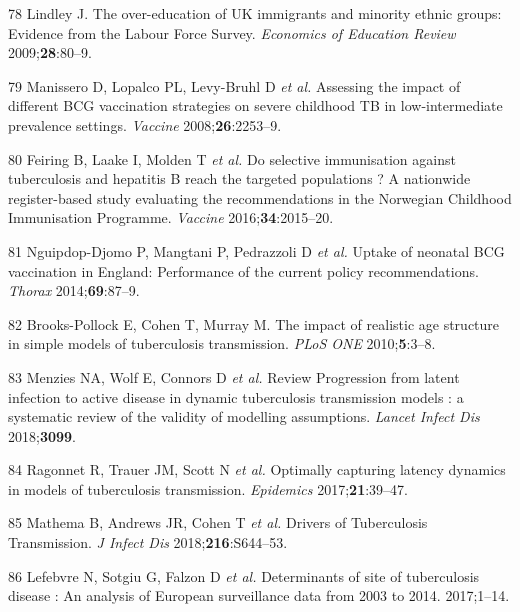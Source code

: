 \documentclass[11pt,twoside]{bristolthesis}
\begin{document}
  \leavevmode\hypertarget{ref-Lindley2009}{}%
  78 Lindley J. The over-education of UK immigrants and minority ethnic groups: Evidence from the Labour Force Survey. \emph{Economics of Education Review} 2009;\textbf{28}:80--9.
  
  \leavevmode\hypertarget{ref-Manissero2008}{}%
  79 Manissero D, Lopalco PL, Levy-Bruhl D \emph{et al.} Assessing the impact of different BCG vaccination strategies on severe childhood TB in low-intermediate prevalence settings. \emph{Vaccine} 2008;\textbf{26}:2253--9.
  
  \leavevmode\hypertarget{ref-Feiring2016}{}%
  80 Feiring B, Laake I, Molden T \emph{et al.} Do selective immunisation against tuberculosis and hepatitis B reach the targeted populations ? A nationwide register-based study evaluating the recommendations in the Norwegian Childhood Immunisation Programme. \emph{Vaccine} 2016;\textbf{34}:2015--20.
  
  \leavevmode\hypertarget{ref-Nguipdop-Djomo2014}{}%
  81 Nguipdop-Djomo P, Mangtani P, Pedrazzoli D \emph{et al.} Uptake of neonatal BCG vaccination in England: Performance of the current policy recommendations. \emph{Thorax} 2014;\textbf{69}:87--9.
  
  \leavevmode\hypertarget{ref-Brooks-Pollock2010a}{}%
  82 Brooks-Pollock E, Cohen T, Murray M. The impact of realistic age structure in simple models of tuberculosis transmission. \emph{PLoS ONE} 2010;\textbf{5}:3--8.
  
  \leavevmode\hypertarget{ref-Menzies2018}{}%
  83 Menzies NA, Wolf E, Connors D \emph{et al.} Review Progression from latent infection to active disease in dynamic tuberculosis transmission models : a systematic review of the validity of modelling assumptions. \emph{Lancet Infect Dis} 2018;\textbf{3099}.
  
  \leavevmode\hypertarget{ref-Ragonnet2017}{}%
  84 Ragonnet R, Trauer JM, Scott N \emph{et al.} Optimally capturing latency dynamics in models of tuberculosis transmission. \emph{Epidemics} 2017;\textbf{21}:39--47.
  
  \leavevmode\hypertarget{ref-Mathema2018}{}%
  85 Mathema B, Andrews JR, Cohen T \emph{et al.} Drivers of Tuberculosis Transmission. \emph{J Infect Dis} 2018;\textbf{216}:S644--53.
  
  \leavevmode\hypertarget{ref-Lefebvre2017}{}%
  86 Lefebvre N, Sotgiu G, Falzon D \emph{et al.} Determinants of site of tuberculosis disease : An analysis of European surveillance data from 2003 to 2014. 2017;1--14.
  
\end{document}
